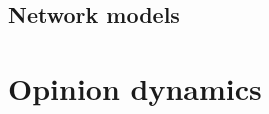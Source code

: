 \documentclass[11 pt , letterpaper , twoside , openright]{book}
\begin{document}

\section{Network models}

\chapter{Opinion dynamics}


\newpage

\end{document}
